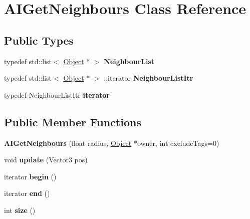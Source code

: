 \hypertarget{classAIGetNeighbours}{
\section{\-A\-I\-Get\-Neighbours \-Class \-Reference}
\label{d0/de6/classAIGetNeighbours}
}
\subsection*{\-Public \-Types}
\begin{DoxyCompactItemize}
\item 
\hypertarget{classAIGetNeighbours_a2cfb66af5813989a936daa1a785fdb74}{
typedef std\-::list$<$ \hyperlink{classObject}{\-Object} $\ast$ $>$ {\bfseries \-Neighbour\-List}}
\label{d0/de6/classAIGetNeighbours_a2cfb66af5813989a936daa1a785fdb74}

\item 
\hypertarget{classAIGetNeighbours_a075e7a2cee46a8249c2e7488b1cd1f70}{
typedef std\-::list$<$ \hyperlink{classObject}{\-Object} $\ast$ $>$\*
\-::iterator {\bfseries \-Neighbour\-List\-Itr}}
\label{d0/de6/classAIGetNeighbours_a075e7a2cee46a8249c2e7488b1cd1f70}

\item 
\hypertarget{classAIGetNeighbours_aa905692982dc06783e2ed58ff5f00070}{
typedef \-Neighbour\-List\-Itr {\bfseries iterator}}
\label{d0/de6/classAIGetNeighbours_aa905692982dc06783e2ed58ff5f00070}

\end{DoxyCompactItemize}
\subsection*{\-Public \-Member \-Functions}
\begin{DoxyCompactItemize}
\item 
\hypertarget{classAIGetNeighbours_a1cc8768b735d2b439e7b35c78c09bda8}{
{\bfseries \-A\-I\-Get\-Neighbours} (float radius, \hyperlink{classObject}{\-Object} $\ast$owner, int exclude\-Tags=0)}
\label{d0/de6/classAIGetNeighbours_a1cc8768b735d2b439e7b35c78c09bda8}

\item 
\hypertarget{classAIGetNeighbours_a294d5f5d065643a2137d8069eeb8d10f}{
void {\bfseries update} (\-Vector3 pos)}
\label{d0/de6/classAIGetNeighbours_a294d5f5d065643a2137d8069eeb8d10f}

\item 
\hypertarget{classAIGetNeighbours_a0e4ead6e9cbf21a33ce5e49b72998916}{
iterator {\bfseries begin} ()}
\label{d0/de6/classAIGetNeighbours_a0e4ead6e9cbf21a33ce5e49b72998916}

\item 
\hypertarget{classAIGetNeighbours_ab5c5c1b4ec7bec43627423dd938270fd}{
iterator {\bfseries end} ()}
\label{d0/de6/classAIGetNeighbours_ab5c5c1b4ec7bec43627423dd938270fd}

\item 
\hypertarget{classAIGetNeighbours_abe012ab902e7461722dbe4da0508b40d}{
int {\bfseries size} ()}
\label{d0/de6/classAIGetNeighbours_abe012ab902e7461722dbe4da0508b40d}

\end{DoxyCompactItemize}
